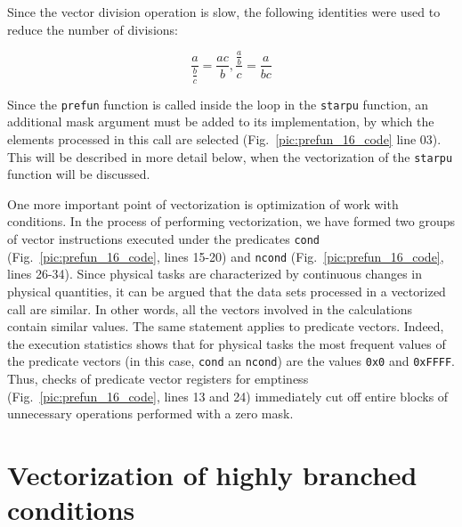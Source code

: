\documentclass[utf8,english]{psta}%
\begin{document}
Since the vector division operation is slow, the following identities were used to reduce the number of divisions:

\begin{equation}\label{eq:deldel}
\frac{a}{\frac{b}{c}} = \frac{ac}{b}, \frac{\frac{a}{b}}{c} = \frac{a}{bc}
\end{equation} 

Since the \texttt{prefun} function is called inside the loop in the \texttt{starpu} function, an additional mask argument must be added to its implementation, by which the elements processed in this call are selected (Fig.~\ref{pic:prefun_16_code} line 03).
This will be described in more detail below, when the vectorization of the \texttt{starpu} function will be discussed.

One more important point of vectorization is optimization of work with conditions.
In the process of performing vectorization, we have formed two groups of vector instructions executed under the predicates \texttt{cond} (Fig.~\ref{pic:prefun_16_code}, lines 15-20) and \texttt{ncond} (Fig.~\ref{pic:prefun_16_code}, lines 26-34).
Since physical tasks are characterized by continuous changes in physical quantities, it can be argued that the data sets processed in a vectorized call are similar.
In other words, all the vectors involved in the calculations contain similar values.
The same statement applies to predicate vectors.
Indeed, the execution statistics shows that for physical tasks the most frequent values of the predicate vectors (in this case, \texttt{cond} an \texttt{ncond}) are the values \texttt{0x0} and \texttt{0xFFFF}.
Thus, checks of predicate vector registers for emptiness (Fig.~\ref{pic:prefun_16_code}, lines 13 and 24) immediately cut off entire blocks of unnecessary operations performed with a zero mask.

\section{Vectorization of highly branched conditions}
\end{document}

